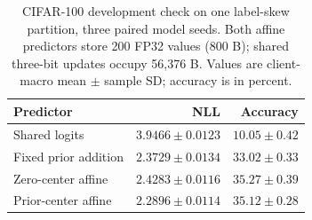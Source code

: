 \begin{table}[t]\centering\small
\caption{CIFAR-100 development check on one label-skew partition, three paired model seeds. Both affine predictors store 200 FP32 values (800 B); shared three-bit updates occupy 56,376 B. Values are client-macro mean $\pm$ sample SD; accuracy is in percent.}
\label{tab:cifar100dev}
\begin{tabular}{lrr}\toprule
Predictor & NLL & Accuracy \\\midrule
Shared logits & $3.9466\pm0.0123$ & $10.05\pm0.42$ \\
Fixed prior addition & $2.3729\pm0.0134$ & $33.02\pm0.33$ \\
Zero-center affine & $2.4283\pm0.0116$ & $35.27\pm0.39$ \\
Prior-center affine & $2.2896\pm0.0114$ & $35.12\pm0.28$ \\
\bottomrule\end{tabular}\end{table}
